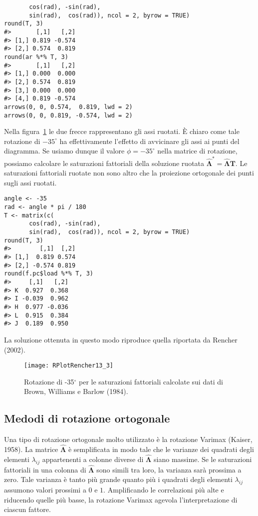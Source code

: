\begin{exmp}
\begin{lstlisting}
       cos(rad), -sin(rad),
       sin(rad),  cos(rad)), ncol = 2, byrow = TRUE)    
round(T, 3)
#>       [,1]   [,2]
#> [1,] 0.819 -0.574
#> [2,] 0.574  0.819
round(ar %*% T, 3)
#>       [,1]   [,2]
#> [1,] 0.000  0.000
#> [2,] 0.574  0.819
#> [3,] 0.000  0.000
#> [4,] 0.819 -0.574
arrows(0, 0, 0.574,  0.819, lwd = 2)
arrows(0, 0, 0.819, -0.574, lwd = 2)
\end{lstlisting}
Nella figura~\ref{fig:brown} le due frecce rappresentano gli assi
ruotati.  È chiaro come tale rotazione di $-35^{\circ}$ ha effettivamente l'effetto di avvicinare gli assi ai punti del diagramma. 
Se usiamo dunque il valore $\phi = -35^{\circ}$ nella matrice di rotazione, possiamo  calcolare le saturazioni fattoriali della soluzione ruotata $\hat{\boldsymbol{\Lambda}}^* = \hat{\boldsymbol{\Lambda}} \textbf{T}$. Le saturazioni fattoriali ruotate non sono altro che la proiezione ortogonale dei punti sugli assi ruotati.
\begin{lstlisting}
angle <- -35
rad <- angle * pi / 180
T <- matrix(c(
       cos(rad), -sin(rad),
       sin(rad),  cos(rad)), ncol = 2, byrow = TRUE)
round(T, 3)
#>        [,1]  [,2]
#> [1,]  0.819 0.574
#> [2,] -0.574 0.819 
round(f.pc$load %*% T, 3)
#>     [,1]   [,2]
#> K  0.927  0.368
#> I -0.039  0.962
#> H  0.977 -0.036
#> L  0.915  0.384
#> J  0.189  0.950 
\end{lstlisting}
La soluzione ottenuta in questo modo riproduce quella riportata da Rencher (2002).
\end{exmp}

  \begin{figure}[h!]
  \centering
    \texttt{[image: RPlotRencher13\_3]}
    \caption{Rotazione di -35$^{\circ}$ per le saturazioni fattoriali calcolate sui dati di Brown, Williams e Barlow (1984).}
    \label{fig:brown}
    \end{figure}

\subsection{Medodi di rotazione ortogonale}

Una tipo di rotazione ortogonale molto utilizzato è la rotazione Varimax (Kaiser,
1958). La matrice $\hat{\boldsymbol{\Lambda}}$ è semplificata in modo
tale che le varianze dei quadrati degli elementi $\lambda_{ij}$
appartenenti a colonne diverse di $\hat{\boldsymbol{\Lambda}}$ siano
massime. Se le saturazioni fattoriali in una colonna di
 $\hat{\boldsymbol{\Lambda}}$ sono simili tra loro, la varianza sarà
 prossima a zero. 
Tale varianza è tanto più grande quanto più i
quadrati degli elementi $\lambda_{ij}$ assumono valori prossimi a
$0$ e $1$. Amplificando le correlazioni più alte e riducendo quelle
più basse, la rotazione Varimax agevola l'interpretazione di ciascun
fattore.

